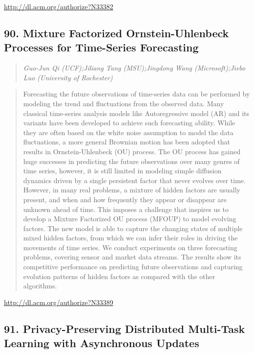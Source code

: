 \documentclass{article}
\begin{document}
\href{http://dl.acm.org/authorize?N33382}{http://dl.acm.org/authorize?N33382}

\subsection{90. Mixture Factorized Ornstein-Uhlenbeck Processes for Time-Series Forecasting}

\begin{quote}
\footnotesize{\textit{Guo-Jun Qi (UCF);Jiliang Tang (MSU);Jingdong Wang (Microsoft);Jiebo Luo (University of Rochester)}}

\end{quote}

\begin{quote}
Forecasting the future observations of time-series data can be performed by modeling the trend and fluctuations from the observed data. Many classical time-series analysis models like Autoregressive model (AR) and its variants have been developed to achieve such forecasting ability. While they are often based on the white noise assumption to model the data fluctuations, a more general Brownian motion has been adopted that results in Ornstein-Uhlenbeck (OU) process. The OU process has gained huge successes in predicting the future observations over many genres of time series, however, it is still limited in modeling simple diffusion dynamics driven by a single persistent factor that never evolves over time. However, in many real problems, a mixture of hidden factors are usually present, and when and how frequently they appear or disappear are unknown ahead of time. This imposes a challenge that inspires us to develop a Mixture Factorized OU process (MFOUP) to model evolving factors. The new model is able to capture the changing states of multiple mixed hidden factors, from which we can infer their roles in driving the movements of time series. We conduct experiments on three forecasting problems, covering sensor and market data streams. The results show its competitive performance on predicting future observations and capturing evolution patterns of hidden factors as compared with the other algorithms.
\end{quote}

\href{http://dl.acm.org/authorize?N33389}{http://dl.acm.org/authorize?N33389}

\subsection{91. Privacy-Preserving Distributed Multi-Task Learning with Asynchronous Updates}
\end{document}
